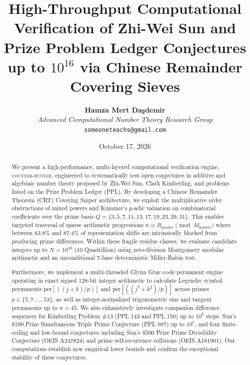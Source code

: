 \documentclass[11pt,a4paper]{article}
\title{\textbf{High-Throughput Computational Verification of Zhi-Wei Sun and Prize Problem Ledger Conjectures up to $10^{16}$ via Chinese Remainder Covering Sieves}}
\author{\textbf{Hamza Mert Da\c{s}demir} \\
\textit{Advanced Computational Number Theory Research Group} \\
\texttt{someoneteachs@gmail.com}}
\date{October 17, 2026}
\theoremstyle{definition}
\theoremstyle{remark}
\begin{document}
\maketitle

\begin{abstract}
We present a high-performance, multi-layered computational verification engine, \textsc{counter-hunter}, engineered to systematically test open conjectures in additive and algebraic number theory proposed by Zhi-Wei Sun, Clark Kimberling, and problems listed on the Prize Problem Ledger (PPL). By developing a Chinese Remainder Theorem (CRT) Covering Sniper architecture, we exploit the multiplicative order obstructions of mixed powers and Kummer's $p$-adic valuation on combinatorial coefficients over the prime basis $Q = \{3, 5, 7, 11, 13, 17, 19, 23, 29, 31\}$. This enables targeted traversal of sparse arithmetic progressions $n \equiv R_{\text{master}} \pmod{M_{\text{master}}}$ where between $63.8\%$ and $87.4\%$ of representation shifts are intrinsically blocked from producing prime differences. Within these fragile residue classes, we evaluate candidate integers up to $N = 10^{16}$ (10 Quadrillion) using zero-division Montgomery modular arithmetic and an unconditional 7-base deterministic Miller-Rabin test.

Furthermore, we implement a multi-threaded Glynn Gray-code permanent engine operating in exact signed 128-bit integer arithmetic to calculate Legendre symbol permanents $\mathrm{per}[((j+k)/p)]$ and $\mathrm{per}[((j^2+k^2)/p)]$ across primes $p \in \{5, 7, \dots, 53\}$, as well as integer-normalized trigonometric sine and tangent permanents up to $n = 45$. We also exhaustively investigate companion difference sequences for Kimberling Problem \#13 (PPL 143 and PPL 150) up to $10^6$ steps, Sun's $\$100$ Prize Simultaneous Triple Prime Conjecture (PPL 087) up to $10^7$, and four finite-ceiling and low-bound conjectures including Sun's $\$500$ Prize Prime Divisibility Conjecture (OEIS A247824) and prime self-recurrence collisions (OEIS A181901). Our computations establish new empirical lower bounds and confirm the exceptional stability of these conjectures.
\end{abstract}
\end{document}
